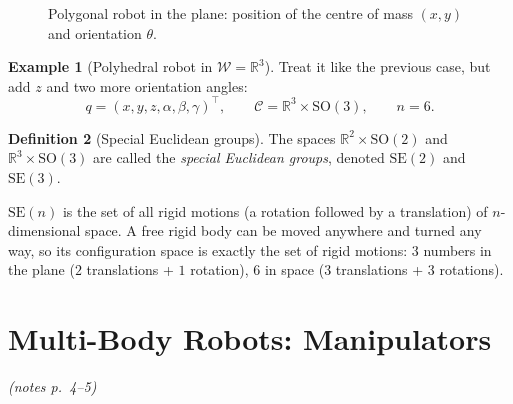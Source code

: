 \documentclass[11pt,a4paper]{article}
\newcommand{\R}{\mathbb{R}}
\newcommand{\W}{\mathcal{W}}
\newcommand{\C}{\mathcal{C}}
\newcommand{\SO}{\mathrm{SO}}
\newcommand{\SE}{\mathrm{SE}}
\newcommand{\pts}[1]{\emph{(notes p.~#1)}}
\theoremstyle{definition}
\newtheorem{definition}{Definition}[section]
\newtheorem{example}[definition]{Example}
\theoremstyle{plain}
\theoremstyle{remark}
\begin{document}
\begin{figure}[ht]
\centering
{}
\caption{Polygonal robot in the plane: position of the centre of mass $(x,y)$ and orientation $\theta$.}
\end{figure}

\begin{example}[Polyhedral robot in $\W=\R^3$]
Treat it like the previous case, but add $z$ and two more orientation angles:
\[
  q=(x,y,z,\alpha,\beta,\gamma)^\top,\qquad \C=\R^3\times\SO(3),\qquad n=6.
\]
\end{example}

\begin{definition}[Special Euclidean groups]
The spaces $\R^2\times\SO(2)$ and $\R^3\times\SO(3)$ are called the \emph{special Euclidean groups}, denoted $\SE(2)$ and $\SE(3)$.
\end{definition}

\begin{intuition}
$\SE(n)$ is the set of all rigid motions (a rotation followed by a translation) of $n$-dimensional space. A free rigid body can be moved anywhere and turned any way, so its configuration space is exactly the set of rigid motions: $3$ numbers in the plane ($2$ translations + $1$ rotation), $6$ in space ($3$ translations + $3$ rotations).
\end{intuition}

\section{Multi-Body Robots: Manipulators}\pts{4--5}
\end{document}
